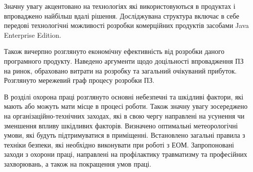 \par Значну увагу акцентовано на технологіях які використовуються в продуктах і впроваджено найбільш вдалі рішення. Досліджувана структура включає в себе передові технологічні можливості розробки комерційних продуктів засобами Java Enterprise Edition.

\par Також вичерпно розглянуто економічну ефективність від розробки даного програмного продукту. Наведено аргументи щодо доцільності впровадження ПЗ на ринок, обраховано витрати на розробку та загальний очікуваний прибуток. Розглянуто мережевий граф процесу розробки ПЗ.

\par В розділі охорона праці розглянуто основні небезпечні та шкідливі фактори, які мають або можуть мати місце в процесі роботи. Також значну увагу зосереджено на організаційно-технічних заходах, які в свою чергу направлені на усунення чи зменшення впливу шкідливих факторів. Визначено оптимальні метеорологічні умови, які будуть підтримуватися в приміщенні. Встановлено загальні правила з техніки безпеки, які необхідно виконувати при роботі з ЕОМ. Запропоновані заходи з охорони праці, направлені на профілактику травматизму та професійних захворювань, а також на покращення умов праці.



